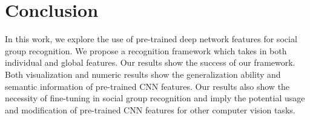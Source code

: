 \documentclass[10pt,twocolumn,letterpaper]{article}
\begin{document}
\section{Conclusion}
In this work, we explore the use of pre-trained deep network features for social group recognition. We propose a recognition framework which takes in both individual and global features. Our results show the success of our framework. Both visualization and numeric results show the generalization ability and semantic information of pre-trained CNN features. Our results also show the necessity of  fine-tuning in social group recognition and imply the potential usage and modification of pre-trained CNN features for other computer vision tasks. 




{\small


}
\end{document}
